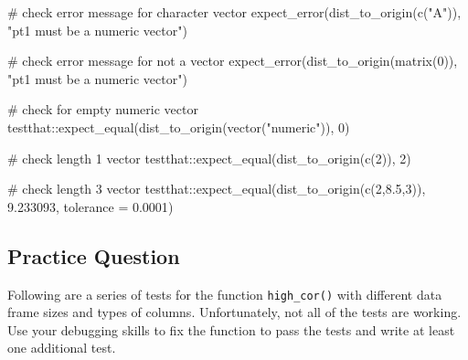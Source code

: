 \documentclass[
  letterpaper,
]{latex/krantz}
\makeatletter
\newenvironment{Shaded}{\begin{snugshade}}{\end{snugshade}}
\newcommand{\AttributeTok}[1]{\textcolor[rgb]{0.40,0.45,0.13}{#1}}
\newcommand{\CommentTok}[1]{\textcolor[rgb]{0.37,0.37,0.37}{#1}}
\newcommand{\DecValTok}[1]{\textcolor[rgb]{0.68,0.00,0.00}{#1}}
\newcommand{\FloatTok}[1]{\textcolor[rgb]{0.68,0.00,0.00}{#1}}
\newcommand{\FunctionTok}[1]{\textcolor[rgb]{0.28,0.35,0.67}{#1}}
\newcommand{\NormalTok}[1]{\textcolor[rgb]{0.00,0.23,0.31}{#1}}
\newcommand{\SpecialCharTok}[1]{\textcolor[rgb]{0.37,0.37,0.37}{#1}}
\newcommand{\StringTok}[1]{\textcolor[rgb]{0.13,0.47,0.30}{#1}}
\newenvironment{kframe}{%
\medskip{}
\setlength{\fboxsep}{.8em}
 \def\at@end@of@kframe{}%
 \ifinner\ifhmode%
  \def\at@end@of@kframe{\end{minipage}}%
  \begin{minipage}{\columnwidth}%
 \fi\fi%
 \def\FrameCommand##1{\hskip\@totalleftmargin \hskip-\fboxsep
 \colorbox{shadecolor}{##1}\hskip-\fboxsep
     \hskip-\linewidth \hskip-\@totalleftmargin \hskip\columnwidth}%
 \MakeFramed {\advance\hsize-\width
   \@totalleftmargin\z@ \linewidth\hsize
   \@setminipage}}%
 {\par\unskip\endMakeFramed%
 \at@end@of@kframe}
\renewenvironment{Shaded}{\begin{kframe}}{\end{kframe}}
\makeatother
\begin{document}
\begin{Shaded}
\begin{Highlighting}[]
\CommentTok{\# check error message for character vector}
\FunctionTok{expect\_error}\NormalTok{(}\FunctionTok{dist\_to\_origin}\NormalTok{(}\FunctionTok{c}\NormalTok{(}\StringTok{"A"}\NormalTok{)), }
                       \StringTok{"pt1 must be a numeric vector"}\NormalTok{)}

\CommentTok{\# check error message for not a vector}
\FunctionTok{expect\_error}\NormalTok{(}\FunctionTok{dist\_to\_origin}\NormalTok{(}\FunctionTok{matrix}\NormalTok{(}\DecValTok{0}\NormalTok{)), }
                       \StringTok{"pt1 must be a numeric vector"}\NormalTok{)}

\CommentTok{\# check for empty numeric vector}
\NormalTok{testthat}\SpecialCharTok{::}\FunctionTok{expect\_equal}\NormalTok{(}\FunctionTok{dist\_to\_origin}\NormalTok{(}\FunctionTok{vector}\NormalTok{(}\StringTok{"numeric"}\NormalTok{)), }\DecValTok{0}\NormalTok{)}

\CommentTok{\# check length 1 vector}
\NormalTok{testthat}\SpecialCharTok{::}\FunctionTok{expect\_equal}\NormalTok{(}\FunctionTok{dist\_to\_origin}\NormalTok{(}\FunctionTok{c}\NormalTok{(}\DecValTok{2}\NormalTok{)), }\DecValTok{2}\NormalTok{)}
                       
\CommentTok{\# check length 3 vector}
\NormalTok{testthat}\SpecialCharTok{::}\FunctionTok{expect\_equal}\NormalTok{(}\FunctionTok{dist\_to\_origin}\NormalTok{(}\FunctionTok{c}\NormalTok{(}\DecValTok{2}\NormalTok{,}\FloatTok{8.5}\NormalTok{,}\DecValTok{3}\NormalTok{)), }\FloatTok{9.233093}\NormalTok{,}
                       \AttributeTok{tolerance =} \FloatTok{0.0001}\NormalTok{)}
\end{Highlighting}
\end{Shaded}

\subsection{Practice Question}\label{practice-question-29}

Following are a series of tests for the function \texttt{high\_cor()}
with different data frame sizes and types of columns. Unfortunately, not
all of the tests are working. Use your debugging skills to fix the
function to pass the tests and write at least one additional test.
\end{document}
